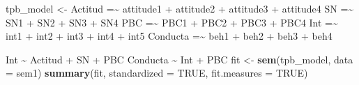 \documentclass[
]{article}
\newenvironment{Shaded}{\begin{snugshade}}{\end{snugshade}}
\newcommand{\AttributeTok}[1]{\textcolor[rgb]{0.13,0.29,0.53}{#1}}
\newcommand{\ConstantTok}[1]{\textcolor[rgb]{0.56,0.35,0.01}{#1}}
\newcommand{\FunctionTok}[1]{\textcolor[rgb]{0.13,0.29,0.53}{\textbf{#1}}}
\newcommand{\NormalTok}[1]{#1}
\newcommand{\OtherTok}[1]{\textcolor[rgb]{0.56,0.35,0.01}{#1}}
\newcommand{\StringTok}[1]{\textcolor[rgb]{0.31,0.60,0.02}{#1}}
\begin{document}
\begin{Shaded}
\begin{Highlighting}[]
\NormalTok{tpb\_model }\OtherTok{\textless{}{-}} \StringTok{\textquotesingle{}}
\StringTok{  Actitud =\textasciitilde{} attitude1 + attitude2 + attitude3 + attitude4}
\StringTok{  SN      =\textasciitilde{} SN1 + SN2 + SN3 + SN4}
\StringTok{  PBC     =\textasciitilde{} PBC1 + PBC2 + PBC3 + PBC4}
\StringTok{  Int     =\textasciitilde{} int1 + int2 + int3 + int4 + int5}
\StringTok{  Conducta =\textasciitilde{} beh1 + beh2 + beh3 + beh4}

\StringTok{  Int \textasciitilde{} Actitud + SN + PBC}
\StringTok{  Conducta \textasciitilde{} Int + PBC}
\StringTok{\textquotesingle{}}
\NormalTok{fit }\OtherTok{\textless{}{-}} \FunctionTok{sem}\NormalTok{(tpb\_model, }\AttributeTok{data =}\NormalTok{ sem1)}
\FunctionTok{summary}\NormalTok{(fit, }\AttributeTok{standardized =} \ConstantTok{TRUE}\NormalTok{, }\AttributeTok{fit.measures =} \ConstantTok{TRUE}\NormalTok{)}
\end{Highlighting}
\end{Shaded}
\end{document}
